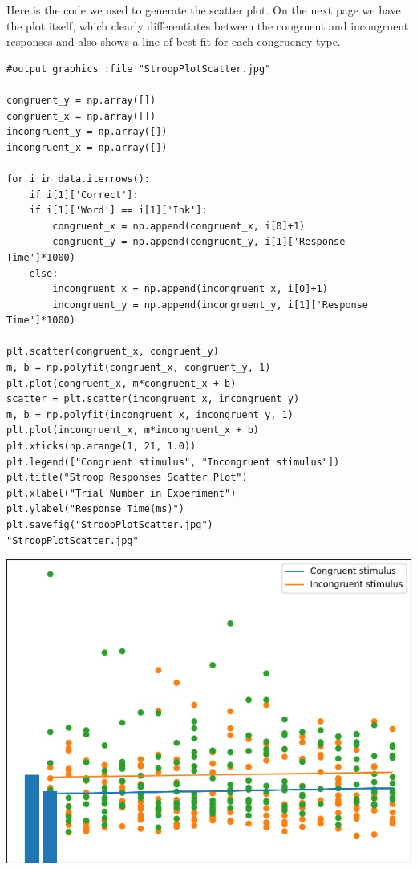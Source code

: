 \documentclass{article}
\begin{document}
Here is the code we used to generate the scatter plot. On the next page we have the plot itself, which clearly differentiates between the congruent and incongruent responses and also shows a line of best fit for each congruency type.

\begin{verbatim}
#output graphics :file "StroopPlotScatter.jpg"

congruent_y = np.array([])
congruent_x = np.array([])
incongruent_y = np.array([])
incongruent_x = np.array([])

for i in data.iterrows():
    if i[1]['Correct']:
	if i[1]['Word'] == i[1]['Ink']:
	    congruent_x = np.append(congruent_x, i[0]+1)
	    congruent_y = np.append(congruent_y, i[1]['Response Time']*1000)
	else:
	    incongruent_x = np.append(incongruent_x, i[0]+1)
	    incongruent_y = np.append(incongruent_y, i[1]['Response Time']*1000)

plt.scatter(congruent_x, congruent_y)
m, b = np.polyfit(congruent_x, congruent_y, 1)
plt.plot(congruent_x, m*congruent_x + b)
scatter = plt.scatter(incongruent_x, incongruent_y)
m, b = np.polyfit(incongruent_x, incongruent_y, 1)
plt.plot(incongruent_x, m*incongruent_x + b)
plt.xticks(np.arange(1, 21, 1.0))
plt.legend(["Congruent stimulus", "Incongruent stimulus"])
plt.title("Stroop Responses Scatter Plot")
plt.xlabel("Trial Number in Experiment")
plt.ylabel("Response Time(ms)")
plt.savefig("StroopPlotScatter.jpg")
"StroopPlotScatter.jpg"

\end{verbatim}

\begin{center}
\includegraphics[width=.9\linewidth]{StroopPlotScatter.jpg}
\end{center}
\end{document}
